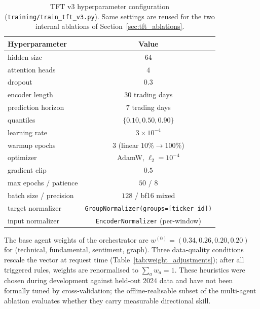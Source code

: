 \documentclass[conference]{IEEEtran}
\begin{document}
\begin{table}[htbp]
\centering
\caption{TFT v3 hyperparameter configuration (\texttt{training/train\_tft\_v3.py}). Same settings are reused for the two internal ablations of Section~\ref{sec:tft_ablations}.}
\label{tab:tft_config}
\scriptsize
\setlength{\tabcolsep}{4pt}
\begin{tabular}{lc}
\toprule
\textbf{Hyperparameter} & \textbf{Value} \\
\midrule
hidden size               & $64$               \\
attention heads           & $4$                \\
dropout                   & $0.3$              \\
encoder length            & $30$ trading days  \\
prediction horizon        & $7$ trading days   \\
quantiles                 & $\{0.10, 0.50, 0.90\}$ \\
learning rate             & $3 \times 10^{-4}$ \\
warmup epochs             & $3$ (linear $10\% \to 100\%$) \\
optimizer                 & AdamW, $\ell_2 = 10^{-4}$ \\
gradient clip             & $0.5$              \\
max epochs / patience     & $50$ / $8$         \\
batch size / precision    & $128$ / bf16 mixed \\
target normalizer         & \texttt{GroupNormalizer(groups=[ticker\_id])} \\
input normalizer          & \texttt{EncoderNormalizer} (per-window)    \\
\bottomrule
\end{tabular}
\end{table}

The base agent weights of the orchestrator are $w^{(0)} = (0.34, 0.26, 0.20, 0.20)$ for (technical, fundamental, sentiment, graph). Three data-quality conditions rescale the vector at request time (Table~\ref{tab:weight_adjustments}); after all triggered rules, weights are renormalised to $\sum_a w_a = 1$. These heuristics were chosen during development against held-out 2024 data and have not been formally tuned by cross-validation; the offline-realisable subset of the multi-agent ablation evaluates whether they carry measurable directional skill.
\end{document}

